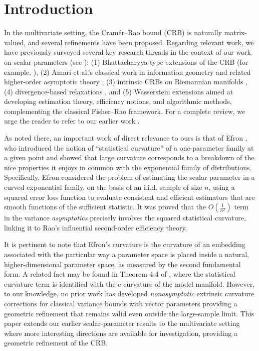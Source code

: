 \documentclass[pdflatex,sn-mathphys-num]{sn-jnl}%
\theoremstyle{thmstyleone}%
\theoremstyle{thmstyletwo}%
\theoremstyle{thmstylethree}%
\begin{document}
\section{Introduction}

In the multivariate setting, the Cramér–Rao bound (CRB) is naturally matrix-valued, and several refinements have been proposed. Regarding relevant work, we have previously surveyed several key research threads in the context of our work on scalar parameters (see \cite{srk}): (1) Bhattacharyya-type extensions of the CRB (for example, \cite{ghosh1987convergence}), (2) Amari et al.'s \cite{amari} classical work in information geometry and related higher-order asymptotic theory \cite{takeuchi2003second,okamoto1991asymptotic}, (3) intrinsic CRBs on Riemannian manifolds \cite{smith_intrinsic_crb,boumal2013_intrinsic_crb,bouchard2024}, (4) divergence-based relaxations \cite{mishra2020,ashok2020,mishra2021}, and (5) Wasserstein extensions \cite{Li,nishimori2025, garciatrillos_wcrb, amari_matsuda_Wasserstein, fukushi2024flatness, zuo2025} aimed at developing estimation theory, efficiency notions, and algorithmic methods, complementing the classical Fisher--Rao framework. For a complete review, we urge the reader to refer to our earlier work \cite{srk}. 

As noted there, an important work of direct relevance to ours is that of Efron \cite{efron1975}, who introduced the notion of ``statistical curvature'' of a one-parameter family at a given point and showed that large curvature corresponds to a breakdown of the nice properties it enjoys in common with the exponential family of distributions. Specifically, Efron considered the problem of estimating the scalar parameter in a curved exponential family, on the basis of an i.i.d. sample of size \(n\), using a squared error loss function to evaluate consistent and efficient estimators that are smooth functions of the sufficient statistic. It was proved that the \(O(\tfrac{1}{n^2})\) term in the variance \textit{asymptotics} precisely involves the squared statistical curvature, linking it to Rao's influential second-order efficiency theory. 

It is pertinent to note that Efron's curvature is the curvature of an embedding associated with the particular way a parameter space is placed inside a natural, higher-dimensional parameter space, as measured by the second fundamental form. 
A related fact may be found in Theorem 4.4 of \cite{amari}, where the statistical curvature term is identified with the e-curvature of the model manifold. However, to our knowledge, no prior work has developed \emph{nonasymptotic} extrinsic curvature corrections for classical variance bounds with vector parameters providing a geometric refinement that remains valid even outside the large-sample limit. This paper extends our earlier scalar-parameter results to the multivariate setting where more interesting directions are available for investigation, providing a geometric refinement of the CRB.
\end{document}
